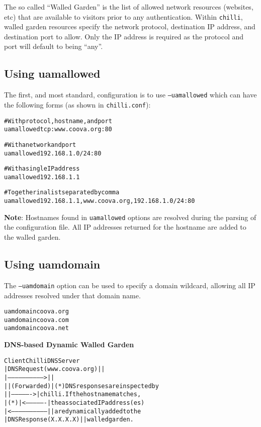 
The so called ``Walled Garden'' is the list of allowed network
resources (websites, etc) that are available to visitors prior to any
authentication. Within \texttt{chilli}, walled garden resources
specify the network protocol, destination IP address, and destination
port to allow. Only the IP address is required as the protocol and
port will default to being ``any''.

\subsection{Using uamallowed}

The first, and most standard, configuration is to use
\texttt{--uamallowed} which can have the following forms (as shown in
\texttt{chilli.conf}):

\begin{alltt}\small
# With protocol, hostname, and port
uamallowed tcp:www.coova.org:80

# With a network and port
uamallowed 192.168.1.0/24:80

# With a single IP address
uamallowed 192.168.1.1

# Together in a list separated by comma
uamallowed 192.168.1.1,www.coova.org,192.168.1.0/24:80
\end{alltt}

\textbf{Note}: Hostnames found in \texttt{uamallowed} options are
resolved during the parsing of the configuration file. All IP
addresses returned for the hostname are added to the walled garden.

\subsection{Using uamdomain}

The \texttt{--uamdomain} option can be used to specify a domain
wildcard, allowing all IP addresses resolved under that domain name. 

\begin{alltt}\small
uamdomain coova.org
uamdomain coova.com
uamdomain coova.net
\end{alltt}

\textbf{DNS-based Dynamic Walled Garden}
\begin{alltt}\small
Client                          Chilli          DNS Server
  | DNS Request (www.coova.org)   |                 | 
  |------------------------------>|                 |
  |                               | (Forwarded)     |   (*) DNS responses are inspected by 
  |                               |---------------->|       chilli. If the hostname matches,
  |                            (*)|<----------------|       the associated IP address(es)
  |<------------------------------|                 |       are dynamically added to the 
  | DNS Response (X.X.X.X)        |                 |       walled garden. 
\end{alltt}

